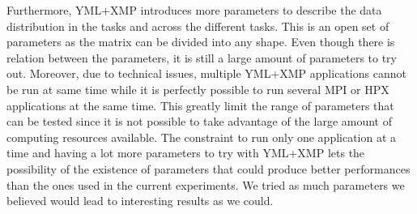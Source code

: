 Furthermore, YML+XMP introduces more parameters to describe the data distribution in the tasks and across the different tasks.
This is an open set of parameters as the matrix can be divided into any shape.
Even though there is relation between the parameters, it is still a large amount of parameters to try out.
Moreover, due to technical issues, multiple YML+XMP applications cannot be run at same time while it is perfectly possible to run several MPI or HPX applications at the same time.
This greatly limit the range of parameters that can be tested since it is not possible to take advantage of the large amount of computing resources available.
The constraint to run only one application at a time and having a lot more parameters to try with YML+XMP lets the possibility of the existence of parameters that could produce better performances than the ones used in the current experiments.
We tried as much parameters we believed would lead to interesting results as we could.

%
%	
%	
%	
%	
%
%	
%	
%	
%	


